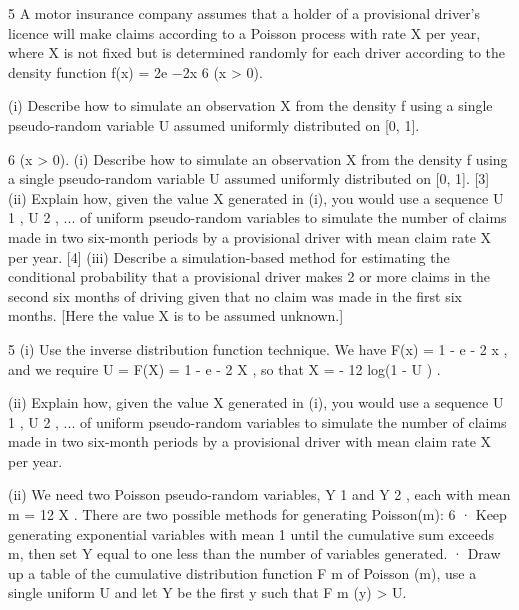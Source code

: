\documentclass[a4paper,12pt]{article}
\begin{document}
\begin{enumerate}

5
A motor insurance company assumes that a holder of a provisional driver’s
licence will make claims according to a Poisson process with rate X per year,
where X is not fixed but is determined randomly for each driver according to the
density function
f(x) = 2e −2x
6
(x > 0).
\begin{framed}
\large
(i) Describe how to simulate an observation X from the density f using a
single pseudo-random variable U assumed uniformly distributed on [0, 1].

\end{framed}

6
(x > 0).
(i) Describe how to simulate an observation X from the density f using a
single pseudo-random variable U assumed uniformly distributed on [0, 1].
[3]
(ii) Explain how, given the value X generated in (i), you would use a sequence
U 1 , U 2 , ... of uniform pseudo-random variables to simulate the number of
claims made in two six-month periods by a provisional driver with mean
claim rate X per year.
[4]
(iii) Describe a simulation-based method for estimating the conditional
probability that a provisional driver makes 2 or more claims in the second
six months of driving given that no claim was made in the first six
months. [Here the value X is to be assumed unknown.]





5
(i)
Use the inverse distribution function technique.
We have F(x) = 1 - e - 2 x , and we require U = F(X) = 1 - e - 2 X , so that
X = - 12 log(1 - U ) .

\begin{framed}
\large
(ii) Explain how, given the value X generated in (i), you would use a sequence
U 1 , U 2 , ... of uniform pseudo-random variables to simulate the number of
claims made in two six-month periods by a provisional driver with mean
claim rate X per year.
\end{framed}

(ii)
We need two Poisson pseudo-random variables, Y 1 and Y 2 , each with
mean m = 12 X .
There are two possible methods for generating Poisson(m):
6
· Keep generating exponential variables with mean 1 until the
cumulative sum exceeds m, then set Y equal to one less than the
number of variables generated.
· Draw up a table of the cumulative distribution function F m of Poisson (m), use a single uniform U and let Y be the first y such
that F m (y) > U.



\end{enumerate}
\end{document}
